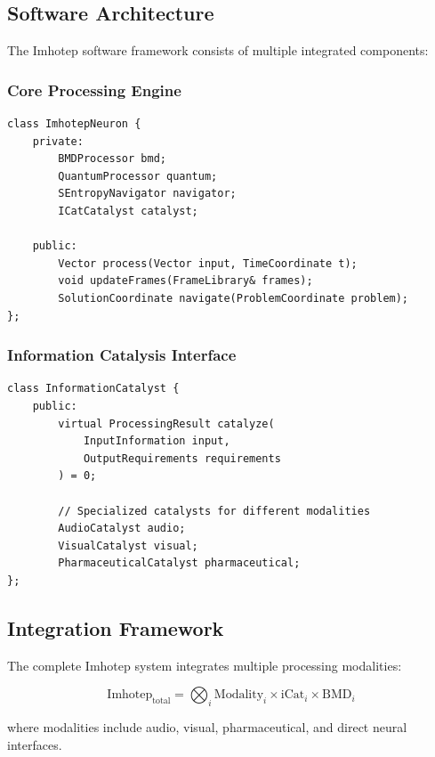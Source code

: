 \documentclass[12pt,a4paper]{article}
\theoremstyle{remark}
\begin{document}
\subsection{Software Architecture}

The Imhotep software framework consists of multiple integrated components:

\subsubsection{Core Processing Engine}

\begin{verbatim}
class ImhotepNeuron {
    private:
        BMDProcessor bmd;
        QuantumProcessor quantum;
        SEntropyNavigator navigator;
        ICatCatalyst catalyst;
        
    public:
        Vector process(Vector input, TimeCoordinate t);
        void updateFrames(FrameLibrary& frames);
        SolutionCoordinate navigate(ProblemCoordinate problem);
};
\end{verbatim}

\subsubsection{Information Catalysis Interface}

\begin{verbatim}
class InformationCatalyst {
    public:
        virtual ProcessingResult catalyze(
            InputInformation input,
            OutputRequirements requirements
        ) = 0;
        
        // Specialized catalysts for different modalities
        AudioCatalyst audio;
        VisualCatalyst visual;
        PharmaceuticalCatalyst pharmaceutical;
};
\end{verbatim}

\subsection{Integration Framework}

The complete Imhotep system integrates multiple processing modalities:

\begin{equation}
\text{Imhotep}_{\text{total}} = \bigotimes_{i} \text{Modality}_i \times \text{iCat}_i \times \text{BMD}_i
\end{equation}

where modalities include audio, visual, pharmaceutical, and direct neural interfaces.
\end{document}
